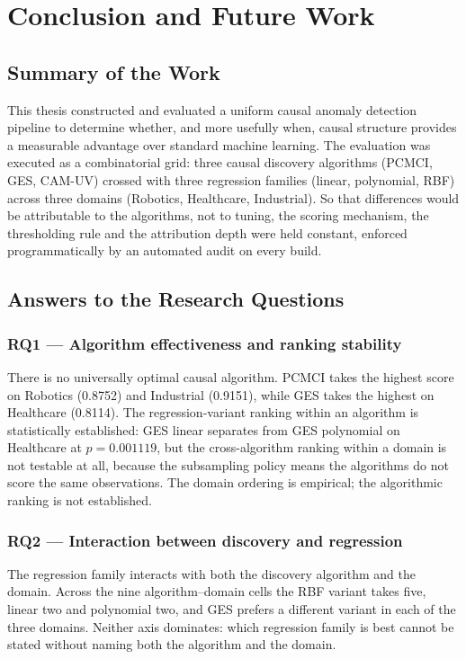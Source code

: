 \chapter{Conclusion and Future Work}
\label{ch:conclusion}

\section{Summary of the Work}
\label{sec:conc-summary}

This thesis constructed and evaluated a uniform causal anomaly detection pipeline to determine whether, and more usefully when, causal structure provides a measurable advantage over standard machine learning. The evaluation was executed as a combinatorial grid: three causal discovery algorithms (PCMCI, GES, CAM-UV) crossed with three regression families (linear, polynomial, RBF) across three domains (Robotics, Healthcare, Industrial). So that differences would be attributable to the algorithms, not to tuning, the scoring mechanism, the thresholding rule and the attribution depth were held constant, enforced programmatically by an automated audit on every build.

\section{Answers to the Research Questions}
\label{sec:conc-rqs}

\subsection*{RQ1 --- Algorithm effectiveness and ranking stability}
There is no universally optimal causal algorithm. PCMCI takes the highest score on Robotics (0.8752) and Industrial (0.9151), while GES takes the highest on Healthcare (0.8114). The regression-variant ranking within an algorithm is statistically established: GES linear separates from GES polynomial on Healthcare at $p = 0.001119$, but the cross-algorithm ranking within a domain is not testable at all, because the subsampling policy means the algorithms do not score the same observations. The domain ordering is empirical; the algorithmic ranking is not established.

\subsection*{RQ2 --- Interaction between discovery and regression}
The regression family interacts with both the discovery algorithm and the domain. Across the nine algorithm--domain cells the RBF variant takes five, linear two and polynomial two, and GES prefers a different variant in each of the three domains. Neither axis dominates: which regression family is best cannot be stated without naming both the algorithm and the domain.

